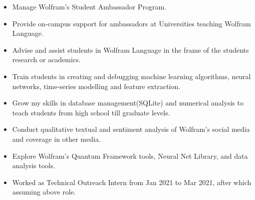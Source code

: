 \documentclass[10pt,a4paper,ragged2e,withhyper]{altacv}
\begin{document}
\begin{paracol}{2}




\begin{itemize}
    \item Manage Wolfram's Student Ambassador Program.
    \item Provide on-campus support for ambassadors at Universities teaching Wolfram Language.
    \item Advise and assist students in Wolfram Language in the frame of the students research or academics.
    \item Train students in creating and debugging machine learning algorithms, neural networks, time-series modelling and feature extraction.
    \item Grow my skills in database management(SQLite) and numerical analysis to teach students from high school till graduate levels.
    \item Conduct qualitative textual and sentiment analysis of Wolfram's social media and coverage in other media.
    \item Explore Wolfram's Quantum Framework tools, Neural Net Library, and data analysis tools.
    \item Worked as Technical Outreach Intern from Jan 2021 to Mar 2021, after which assuming above role.
\end{itemize}


\end{paracol}
\end{document}

